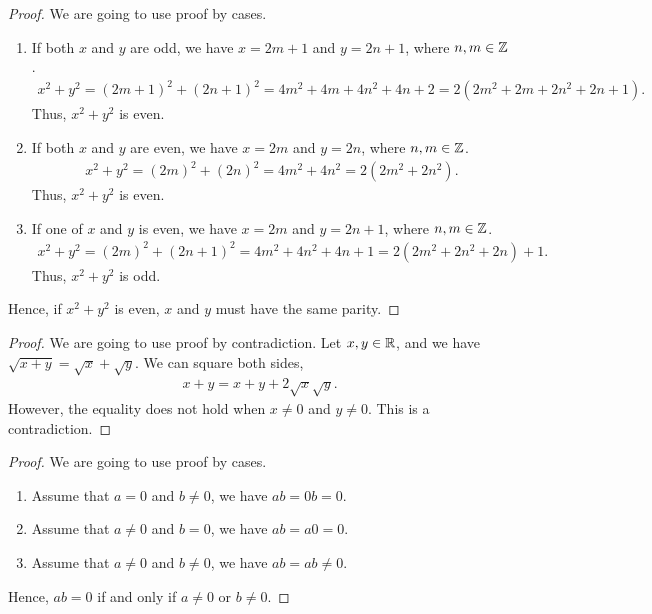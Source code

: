 \documentclass[8pt,twocolumn]{article}
\begin{document}
\begin{Answer}[number=2.2.11]
  \begin{proof}
    We are going to use proof by cases.
    \begin{enumerate}
      \item If both $x$ and $y$ are odd, we have $x=2m+1$ and $y=2n+1$, where
        $n,m\in\mathbb{Z}$.
        \begin{align*}
          x^2 + y^2 = (2m+1)^2 + (2n+1)^2 = 4m^2 + 4m + 4n^2 + 4n + 2 =
          2(2m^2+2m+2n^2+2n+1).
        \end{align*}
        Thus, $x^2+y^2$ is even.
      \item If both $x$ and $y$ are even, we have $x=2m$ and $y=2n$, where
        $n,m\in\mathbb{Z}$.
        \begin{align*}
          x^2 + y^2 = (2m)^2 + (2n)^2 = 4m^2 + 4n^2 = 2(2m^2+2n^2).
        \end{align*}
        Thus, $x^2+y^2$ is even.
      \item If one of $x$ and $y$ is even, we have $x=2m$ and $y=2n+1$, where
        $n,m\in\mathbb{Z}$.
        \begin{align*}
          x^2 + y^2 = (2m)^2 + (2n+1)^2 = 4m^2 + 4n^2 + 4n + 1 =
          2(2m^2+2n^2+2n) + 1.
        \end{align*}
        Thus, $x^2+y^2$ is odd.
    \end{enumerate}
    Hence, if $x^2+y^2$ is even, $x$ and $y$ must have the same parity.
  \end{proof}
\end{Answer}

\begin{Answer}[number=2.2.12]
  \begin{proof}
    We are going to use proof by contradiction. Let $x,y\in\mathbb{R}$, and we have
    $\sqrt{x+y}=\sqrt{x}+\sqrt{y}$. We can square both sides,
    \begin{align*}
      x+y = x + y + 2\sqrt{x}\sqrt{y}.
    \end{align*}
    However, the equality does not hold when $x\ne0$ and $y\ne0$.
    This is a contradiction.
  \end{proof}
\end{Answer}


\begin{Answer}[number=2.2.13]
  \begin{proof}
    We are going to use proof by cases.
    \begin{enumerate}
      \item Assume that $a=0$ and $b\ne0$, we have $ab = 0b = 0$.
      \item Assume that $a\ne0$ and $b=0$, we have $ab = a0 = 0$.
      \item Assume that $a\ne0$ and $b\ne0$, we have $ab = ab \ne 0$.
    \end{enumerate}
    Hence, $ab=0$ if and only if $a\ne0$ or $b\ne0$.
  \end{proof}
\end{Answer}
\end{document}
